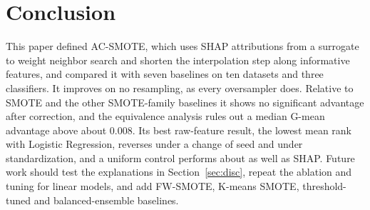 \documentclass[conference,a4paper]{IEEEtran}
\newcommand{\gmean}{\mbox{G-mean}}
\begin{document}
\section{Conclusion}
This paper defined AC-SMOTE, which uses SHAP attributions from a surrogate to weight neighbor search and shorten the interpolation step along informative features, and compared it with seven baselines on ten datasets and three classifiers. It improves on no resampling, as every oversampler does. Relative to SMOTE and the other SMOTE-family baselines it shows no significant advantage after correction, and the equivalence analysis rules out a median \gmean{} advantage above about 0.008. Its best raw-feature result, the lowest mean rank with Logistic Regression, reverses under a change of seed and under standardization, and a uniform control performs about as well as SHAP. Future work should test the explanations in Section~\ref{sec:disc}, repeat the ablation and tuning for linear models, and add FW-SMOTE, K-means SMOTE, threshold-tuned and balanced-ensemble baselines.
\end{document}
